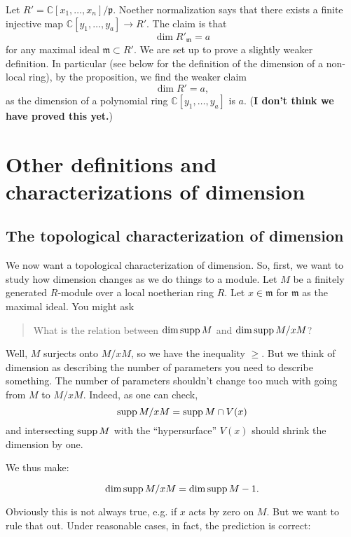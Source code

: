 \begin{example} 
Let $R' = \mathbb{C}[x_1, \dots, x_n]/\mathfrak{p}$. Noether normalization says
that there exists a finite injective map $\mathbb{C}[y_1, \dots, y_a] \to R'$.
The claim is that
\[ \dim R'_{\mathfrak{m}} =a  \]
for any maximal ideal $\mathfrak{m} \subset R'$. We are set up to prove a
slightly weaker definition. In particular (see below for the definition of the
dimension of a non-local ring), by the proposition, we
find the weaker claim
\[ \dim R' = a,  \]
as the dimension of a polynomial ring $\mathbb{C}[y_1, \dots, y_a]$ is $a$.
(\textbf{I don't think we have proved this yet.})
\end{example} 



\section{Other definitions and characterizations of dimension}

\subsection{The topological characterization of dimension} We now want a topological
characterization of dimension. So, first, we want to study how dimension
changes as we do things to a module. Let $M$ be a finitely generated $R$-module over a local
noetherian ring $R$. Let $x \in \mathfrak{m}$ for $\mathfrak{m}$ as the maximal
ideal.
You might ask
\begin{quote}
What is the relation between $\dim \operatorname{supp} M$ and $\dim \operatorname{supp} M/xM$?
\end{quote}
Well, $M$ surjects onto $M/xM$, so we have the inequality $\geq$. But we think
of dimension as describing the number of parameters you need to describe
something. The number of parameters shouldn't change too much with going from
$M$ to $M/xM$. Indeed, as one can check,
\[ \operatorname{supp} M/xM = \operatorname{supp} M \cap V(x)  \]
and intersecting $\operatorname{supp} M$ with the ``hypersurface'' $V(x)$ should shrink the
dimension by one. 


We thus make:
\begin{prediction}
\[ \dim \operatorname{supp} M/xM = \dim \operatorname{supp} M - 1.  \]
\end{prediction}
Obviously this is not always true, e.g. if $x$ acts by zero on $M$. But we want
to rule that out. 
Under reasonable cases, in fact, the prediction is correct:

